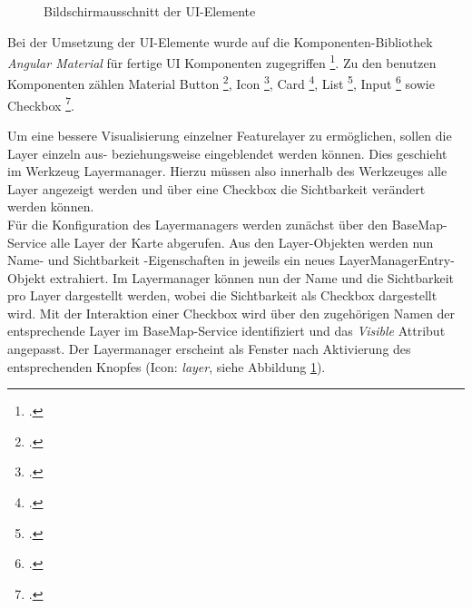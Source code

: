 \begin{figure}[H]
	\caption{Bildschirmausschnitt der UI-Elemente}
	\label{img:toolset}
\end{figure}

Bei der Umsetzung der UI-Elemente wurde auf die Komponenten-Bibliothek \emph{Angular Material} für fertige UI Komponenten zugegriffen \footcite{team_angular_material}.
Zu den benutzen Komponenten zählen Material Button \footcite{team_angular_material_button}, Icon \footcite{team_angular_material_icon}, Card \footcite{team_angular_material_card}, List \footcite{team_angular_material_list}, Input \footcite{team_angular_material_input} sowie Checkbox \footcite{team_angular_material_checkbox}.

Um eine bessere Visualisierung einzelner Featurelayer zu ermöglichen, sollen die Layer einzeln aus- beziehungsweise eingeblendet werden können.
Dies geschieht im Werkzeug Layermanager.
Hierzu müssen also innerhalb des Werkzeuges alle Layer angezeigt werden und über eine Checkbox die Sichtbarkeit verändert werden können.\\
Für die Konfiguration des Layermanagers werden zunächst über den BaseMap-Service alle Layer der Karte abgerufen.
Aus den Layer-Objekten werden nun Name- und Sichtbarkeit -Eigenschaften in jeweils ein neues LayerManagerEntry-Objekt extrahiert.
Im Layermanager können nun der Name und die Sichtbarkeit pro Layer dargestellt werden, wobei die Sichtbarkeit als Checkbox dargestellt wird.
Mit der Interaktion einer Checkbox wird über den zugehörigen Namen der entsprechende Layer im BaseMap-Service identifiziert und das \emph{Visible} Attribut angepasst.
Der Layermanager erscheint als Fenster nach Aktivierung des entsprechenden Knopfes (Icon: \emph{layer}, siehe Abbildung \ref{img:toolset}).

